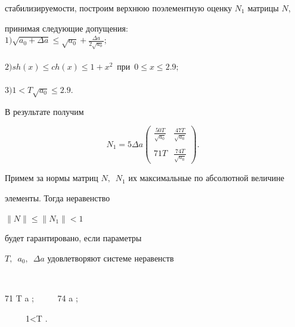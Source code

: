 стабилизируемости, построим верхнюю поэлементную оценку $N_1$ матрицы $N$,


принимая следующие допущения: \\


$ 1) \sqrt{a_0+\Delta a} \le \sqrt{a_0}+\frac{\Delta a}{2 \sqrt{a_0}};$ \\


\\


$ 2) sh(x) \le ch(x) \le 1+x^2 \,\,\, \mbox{при} \, \, \, 0 \le x \le 2.9 ; $ \\


\\


$ 3) 1 < T \sqrt{a_0} \le 2.9$.





\newpage





В результате получим


$$


N_1= 5 \Delta a 


\left( 


\begin{array}{cc}


\frac{50T}{\sqrt{a_0}} & \frac{47T}{\sqrt{a_0}} \\


      &       \\


71T     & \frac{74T}{\sqrt{a_0}} 


\end{array}


\right).


\, \, \, 


$$





Примем за нормы матриц $N, \, \, \, N_1$ их максимальные по абсолютной величине 


элементы. Тогда неравенство


$ \| N \| \le \| N_1 \| < 1 $ 


будет гарантировано, если параметры 


$ T, \, \, \, a_0, \, \, \, \Delta a$ удовлетворяют системе неравенств


$$


71 T \Delta a  ; \, \, \, \, \, 74 \Delta a  ;


\, \, \, \, \, 1<T  .


